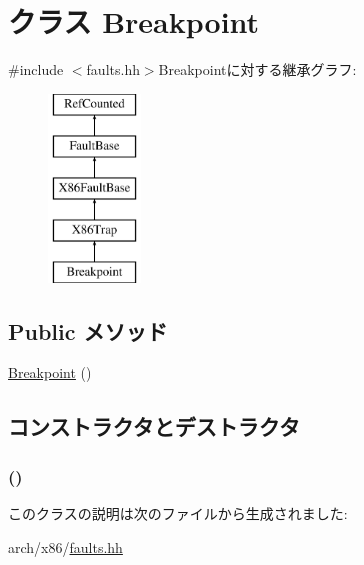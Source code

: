 \hypertarget{classX86ISA_1_1Breakpoint}{
\section{クラス Breakpoint}
\label{classX86ISA_1_1Breakpoint}
}


{\ttfamily \#include $<$faults.hh$>$}Breakpointに対する継承グラフ:\begin{figure}[H]
\begin{center}
\leavevmode
\includegraphics[height=5cm]{classX86ISA_1_1Breakpoint}
\end{center}
\end{figure}
\subsection*{Public メソッド}
\begin{DoxyCompactItemize}
\item 
\hyperlink{classX86ISA_1_1Breakpoint_ab8eea7ed46f81bd2fd0e192e3cbfb3c1}{Breakpoint} ()
\end{DoxyCompactItemize}


\subsection{コンストラクタとデストラクタ}
\hypertarget{classX86ISA_1_1Breakpoint_ab8eea7ed46f81bd2fd0e192e3cbfb3c1}{
\subsubsection[{Breakpoint}]{ ()}}
\label{classX86ISA_1_1Breakpoint_ab8eea7ed46f81bd2fd0e192e3cbfb3c1}



\begin{DoxyCode}
223                      :
224             X86Trap("Breakpoint", "#BP", 3)
225         {}
    };
\end{DoxyCode}


このクラスの説明は次のファイルから生成されました:\begin{DoxyCompactItemize}
\item 
arch/x86/\hyperlink{arch_2x86_2faults_8hh}{faults.hh}\end{DoxyCompactItemize}
